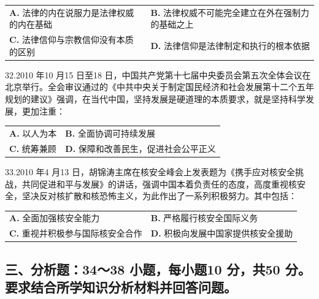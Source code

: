 \documentclass[UTF8,11pt]{ctexart}
\begin{document}
\begin{center}\begin{tabular}{>{\raggedright\arraybackslash}p{\dimexpr(\linewidth-4\tabcolsep)/2\relax}>{\raggedright\arraybackslash}p{\dimexpr(\linewidth-4\tabcolsep)/2\relax}}
\textbf{A.} 法律的内在说服力是法律权威的内在基础 & \textbf{B.} 法律权威不可能完全建立在外在强制力的基础之上\\[.35em]
\textbf{C.} 法律信仰与宗教信仰没有本质的区别 & \textbf{D.} 法律信仰是法律制定和执行的根本依据\\[.35em]\end{tabular}\end{center}

32.2010 年10 月15 日至18 日，中国共产党第十七届中央委员会第五次全体会议在北京举行。全会审议通过的《中共中央关于制定国民经济和社会发展第十二个五年规划的建议》强调，在当代中国，坚持发展是硬道理的本质要求，就是坚持科学发展，更加注重：


\begin{center}\begin{tabular}{>{\raggedright\arraybackslash}p{\dimexpr(\linewidth-4\tabcolsep)/2\relax}>{\raggedright\arraybackslash}p{\dimexpr(\linewidth-4\tabcolsep)/2\relax}}
\textbf{A.} 以人为本 & \textbf{B.} 全面协调可持续发展\\[.35em]
\textbf{C.} 统筹兼顾 & \textbf{D.} 保障和改善民生，促进社会公平正义\\[.35em]\end{tabular}\end{center}

33.2010 年4 月13 日，胡锦涛主席在核安全峰会上发表题为《携手应对核安全挑战，共同促进和平与发展》的讲话，强调中国本着负责任的态度，高度重视核安全，坚决反对核扩散和核恐怖主义，为此作出了一系列积极努力。其中包括：


\begin{center}\begin{tabular}{>{\raggedright\arraybackslash}p{\dimexpr(\linewidth-4\tabcolsep)/2\relax}>{\raggedright\arraybackslash}p{\dimexpr(\linewidth-4\tabcolsep)/2\relax}}
\textbf{A.} 全面加强核安全能力 & \textbf{B.} 严格履行核安全国际义务\\[.35em]
\textbf{C.} 重视并积极参与国际核安全合作 & \textbf{D.} 积极向发展中国家提供核安全援助\\[.35em]\end{tabular}\end{center}

\subsection*{三、分析题：34～38 小题，每小题10 分，共50 分。要求结合所学知识分析材料并回答问题。}
\end{document}

